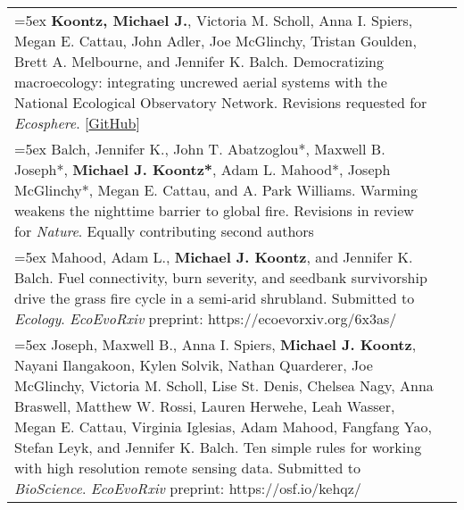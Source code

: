 \begin{longtable}{@{} >{\raggedright}p{6.25in} >{\raggedleft}X @{}}

\hangindent=5ex \textbf{Koontz, Michael J.}, Victoria M. Scholl, Anna I. Spiers, Megan E. Cattau, John Adler, Joe McGlinchy, Tristan Goulden, Brett A. Melbourne, and Jennifer K. Balch. Democratizing macroecology: integrating uncrewed aerial systems with the National Ecological Observatory Network. Revisions requested for \emph{Ecosphere}. [\textcolor{blue}{\href{https://github.com/mikoontz/neon-drone-workflow}{GitHub}}] & \tabularnewline

\hangindent=5ex Balch, Jennifer K., John T. Abatzoglou*, Maxwell B. Joseph*, \textbf{Michael J. Koontz*}, Adam L. Mahood*, Joseph McGlinchy*, Megan E. Cattau, and A. Park Williams. Warming weakens the nighttime barrier to global fire. Revisions in review for \emph{Nature}. 
\newline *Equally contributing second authors & \tabularnewline

\hangindent=5ex Mahood, Adam L., \textbf{Michael J. Koontz}, and Jennifer K. Balch. Fuel connectivity, burn severity, and seedbank survivorship drive the grass fire cycle in a semi-arid shrubland. Submitted to \emph{Ecology}. 
\newline \emph{EcoEvoRxiv} preprint: https://ecoevorxiv.org/6x3as/ & \tabularnewline

\hangindent=5ex Joseph, Maxwell B., Anna I. Spiers, \textbf{Michael J. Koontz}, Nayani Ilangakoon, Kylen Solvik, Nathan Quarderer, Joe McGlinchy, Victoria M. Scholl, Lise St. Denis, Chelsea Nagy, Anna Braswell, Matthew W. Rossi, Lauren Herwehe, Leah Wasser, Megan E. Cattau, Virginia Iglesias, Adam Mahood, Fangfang Yao, Stefan Leyk, and Jennifer K. Balch. Ten simple rules for working with high resolution remote sensing data.  Submitted to \emph{BioScience}. 
\newline \emph{EcoEvoRxiv} preprint: https://osf.io/kehqz/ & \tabularnewline

\end{longtable}

